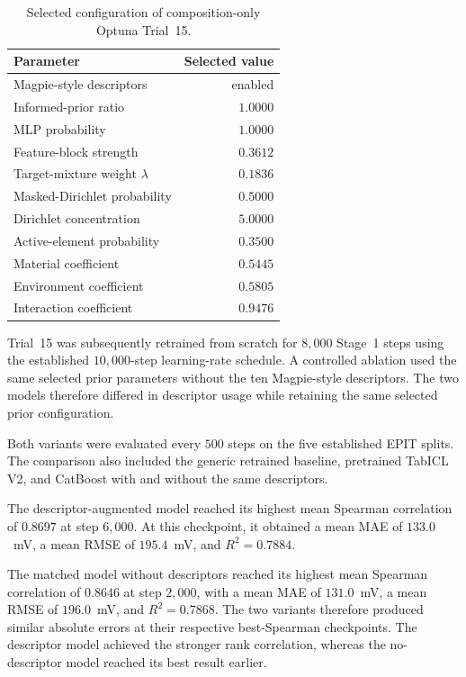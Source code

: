 \documentclass{article}
\begin{document}
\begin{table}[htbp]
\centering
\caption{Selected configuration of composition-only Optuna Trial~15.}
\label{tab:magpie-trial15-configuration}
\begin{tabular}{lr}
\hline
Parameter & Selected value \\
\hline
Magpie-style descriptors & enabled \\
Informed-prior ratio & \(1.0000\) \\
MLP probability & \(1.0000\) \\
Feature-block strength & \(0.3612\) \\
Target-mixture weight \(\lambda\) & \(0.1836\) \\
Masked-Dirichlet probability & \(0.5000\) \\
Dirichlet concentration & \(5.0000\) \\
Active-element probability & \(0.3500\) \\
Material coefficient & \(0.5445\) \\
Environment coefficient & \(0.5805\) \\
Interaction coefficient & \(0.9476\) \\
\hline
\end{tabular}
\end{table}

Trial~15 was subsequently retrained from scratch for \(8{,}000\) Stage~1
steps using the established \(10{,}000\)-step learning-rate schedule. A
controlled ablation used the same selected prior parameters without the ten
Magpie-style descriptors. The two models therefore differed in descriptor
usage while retaining the same selected prior configuration.

Both variants were evaluated every \(500\) steps on the five established EPIT
splits. The comparison also included the generic retrained baseline, pretrained
TabICL V2, and CatBoost with and without the same descriptors.

The descriptor-augmented model reached its highest mean Spearman correlation
of \(0.8697\) at step \(6{,}000\). At this checkpoint, it obtained a mean MAE
of \(133.0\)~mV, a mean RMSE of \(195.4\)~mV, and \(R^2=0.7884\).

The matched model without descriptors reached its highest mean Spearman
correlation of \(0.8646\) at step \(2{,}000\), with a mean MAE of
\(131.0\)~mV, a mean RMSE of \(196.0\)~mV, and \(R^2=0.7868\). The two
variants therefore produced similar absolute errors at their respective
best-Spearman checkpoints. The descriptor model achieved the stronger rank
correlation, whereas the no-descriptor model reached its best result earlier.
\end{document}
